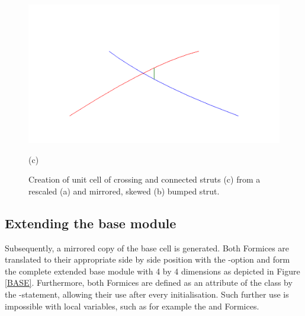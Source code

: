 \begin{figure} [ht]
\begin{latexonly}
\hspace{0.3cm}
\begin{minipage} [c] [] [c] {3.5cm}
	\includegraphics [width =\textwidth] {images/WireStentDemot2Step09}
	\begin{center}
	\vspace{-3ex}
	(c)
	\vspace{1ex}
	\end{center}
\end{minipage}
\hspace{0.3cm}	
   \end{latexonly}
   \begin{htmlonly}
   \end{htmlonly}
	\caption {Creation of unit cell of crossing and connected struts (c) from a rescaled (a) and mirrored, skewed (b) bumped strut.} 
	\label{base}	
\end{figure}

\subsection{Extending the base module}

Subsequently, a mirrored copy of the base cell is generated. Both Formices are translated to their appropriate side by side position with the -option and form the complete extended base module with 4 by 4 dimensions as depicted in Figure \ref{BASE}. Furthermore, both Formices are defined as an attribute of the  class by the -statement, allowing their use after every  initialisation. Such further use is impossible with local variables, such as for example the  and  Formices.
%


